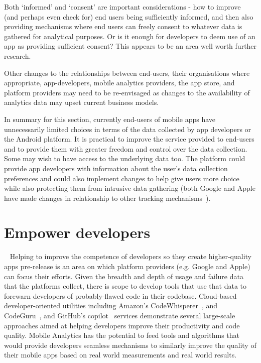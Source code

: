 Both `informed' and `consent' are important considerations - how to improve (and perhaps even check for) end users being sufficiently informed, and then also providing mechanisms where end users can freely consent to whatever data is gathered for analytical purposes. Or is it enough for developers to deem use of an app as providing sufficient consent? This appears to be an area well worth further research. 


Other changes to the relationships between end-users, their organisations where appropriate, app-developers, mobile analytics providers, the app store, and platform providers may need to be re-envisaged as changes to the availability of analytics data may upset current business models.


In summary for this section, currently end-users of mobile apps have unnecessarily limited choices in terms of the data collected by app developers or the Android platform. It is practical to improve the service provided to end-users and to provide them with greater freedom and control over the data collection. Some may wish to have access to the underlying data too. The platform could provide app developers with information about the user's data collection preferences and could also implement changes to help give users more choice while also protecting them from intrusive data gathering (both Google and Apple have made changes in relationship to other tracking mechanisms~). 


\section{Empower developers}~\label{discussion-empower-developers}
Helping to improve the competence of developers so they create higher-quality apps pre-release is an area on which platform providers (e.g. Google and Apple) can focus their efforts.  Given the breadth and depth of usage and failure data that the platforms collect, there is scope to develop tools that use that data to forewarn developers of probably-flawed code in their codebase. Cloud-based developer-oriented utilities including Amazon’s CodeWhisperer~, and CodeGuru~, and GitHub’s copilot~ services demonstrate several large-scale approaches aimed at helping developers improve their productivity and code quality. Mobile Analytics has the potential to feed tools and algorithms that would provide developers seamless mechanisms to similarly improve the quality of their mobile apps based on real world measurements and real world results.


